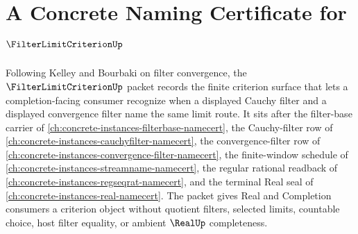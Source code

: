 \chapter{A Concrete Naming Certificate for $\FilterLimitCriterionUp$}
\label{ch:concrete-instances-filter-limit-criterion-namecert}

Following Kelley and Bourbaki on filter convergence, the $\FilterLimitCriterionUp$ packet records the finite criterion surface that lets a completion-facing consumer recognize when a displayed Cauchy filter and a displayed convergence filter name the same limit route. It sits after the filter-base carrier of \autoref{ch:concrete-instances-filterbase-namecert}, the Cauchy-filter row of \autoref{ch:concrete-instances-cauchyfilter-namecert}, the convergence-filter row of \autoref{ch:concrete-instances-convergence-filter-namecert}, the finite-window schedule of \autoref{ch:concrete-instances-streamname-namecert}, the regular rational readback of \autoref{ch:concrete-instances-regseqrat-namecert}, and the terminal Real seal of \autoref{ch:concrete-instances-real-namecert}. The packet gives Real and Completion consumers a criterion object without quotient filters, selected limits, countable choice, host filter equality, or ambient $\RealUp$ completeness.

